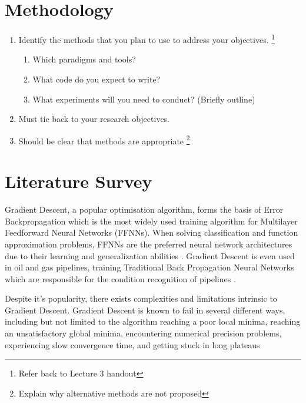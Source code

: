 \documentclass[runningheads,a4paper]{llncs}
\begin{document}
\section{Methodology}

\begin{enumerate}
 \item Identify the methods that you plan to use to address your objectives. \footnote{Refer back to Lecture 3 handout}
 \begin{enumerate}
  \item Which paradigms and tools?
  \item What code do you expect to write?
  \item What experiments will you need to conduct? (Briefly outline)
 \end{enumerate}
 \item Must tie back to your research objectives.
 \item Should be clear that methods are appropriate \footnote{Explain why alternative methods are not proposed}

\end{enumerate}


\section{Literature Survey}

Gradient Descent, a popular optimisation algorithm, forms the basis of Error Backpropagation which is 
the most widely used training algorithm for Multilayer Feedforward Neural Networks (FFNNs). 
When solving classification and function approximation problems, FFNNs are the preferred neural network architectures 
due to their learning and generalization abilities \cite{gong2012training}. Gradient Descent is even used in oil and gas pipelines, 
training Traditional Back Propagation Neural Networks which are responsible for the condition recognition of pipelines \cite{laibin2009novel}.

Despite it's popularity, there exists complexities and limitations intrinsic to Gradient Descent. Gradient Descent is known to fail in
several different ways, including but not limited to the algorithm reaching a poor local minima, reaching an unsatisfactory global minima,
encountering numerical precision problems, experiencing slow convergence time, and getting stuck in long plateaus \cite{baldi1995gradient,cetin1993global,laibin2009novel,soni2013performance}
\end{document}
